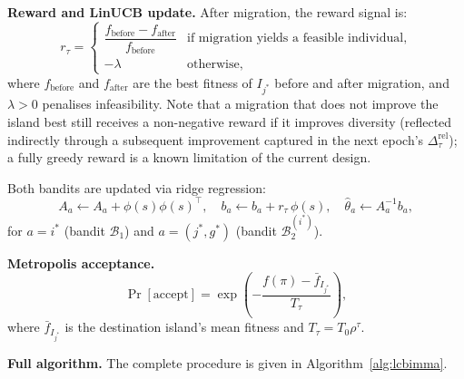 \documentclass[a4paper,fleqn]{cas-dc}
\begin{document}
\textbf{Reward and LinUCB update.}
After migration, the reward signal is:
\begin{equation}\label{eq:reward}
 r_\tau = \begin{cases}
 \dfrac{f_{\mathrm{before}} - f_{\mathrm{after}}}{f_{\mathrm{before}}} & \text{if migration yields a feasible individual,} \\[6pt]
 -\lambda & \text{otherwise,}
 \end{cases}
\end{equation}
where $f_{\mathrm{before}}$ and $f_{\mathrm{after}}$ are the best fitness of $I_{j^*}$ before and after migration, and $\lambda > 0$ penalises infeasibility. Note that a migration that does not improve the island best still receives a non-negative reward if it improves diversity (reflected indirectly through a subsequent improvement captured in the next epoch's $\Delta^{\mathrm{rel}}_\tau$); a fully greedy reward is a known limitation of the current design.

Both bandits are updated via ridge regression:
\begin{equation}\label{eq:linucb_update}
 A_a \leftarrow A_a + \phi(s)\phi(s)^\top, \quad b_a \leftarrow b_a + r_\tau\,\phi(s), \quad \hat\theta_a \leftarrow A_a^{-1} b_a,
\end{equation}
for $a = i^*$ (bandit $\mathcal{B}_1$) and $a = (j^*, g^*)$ (bandit $\mathcal{B}_2^{(i^*)}$).

\textbf{Metropolis acceptance.}
\begin{equation}\label{eq:metropolis}
 \Pr[\text{accept}] = \exp\!\left(-\frac{f(\pi) - \bar{f}_{I_{j^*}}}{T_\tau} \right),
\end{equation}
where $\bar{f}_{I_{j^*}}$ is the destination island's mean fitness and $T_\tau = T_0 \rho^\tau$.

\textbf{Full algorithm.}
The complete procedure is given in Algorithm~\ref{alg:lcbimma}.
\end{document}
